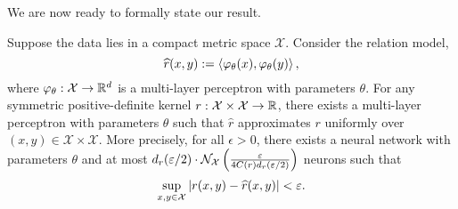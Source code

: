 We are now ready to formally state our result.

\begin{theorem}\label{theorem:symmetric_inner_prod_rels_func_class}
	\hphantom{~}

	Suppose the data lies in a compact metric space \(\mathcal{X}\). Consider the relation model,
	\begin{equation*}
		\hat{r}(x, y) := \iprod{\phi_{\theta}(x)}{\phi_{\theta}(y)},
	\end{equation*}
	where $\varphi_{\theta}: {\mathcal{X}} \to \mathbb{R}^d$ is a multi-layer perceptron with parameters $\theta$.
	For any symmetric positive-definite kernel $r: {\mathcal{X}} \times {\mathcal{X}} \to \mathbb{R}$, there exists a multi-layer perceptron with parameters $\theta$ such that $\hat{r}$ approximates $r$ uniformly over \((x,y) \in \mathcal{X}\times\mathcal{X}\). More precisely, for all \(\epsilon > 0\), there exists a neural network with parameters $\theta$ and at most $d_r(\varepsilon / 2) \cdot {\mathcal{N}}_{\mathcal{X}}\left(\frac{\varepsilon}{4 C(r) d_r(\varepsilon / 2)}\right)$ neurons such that
    \[\sup_{x,y \in \mathcal{X}}{\left\lvert r(x,y) - \widehat{r}(x,y)\right\rvert} < \varepsilon.\]
\end{theorem}

